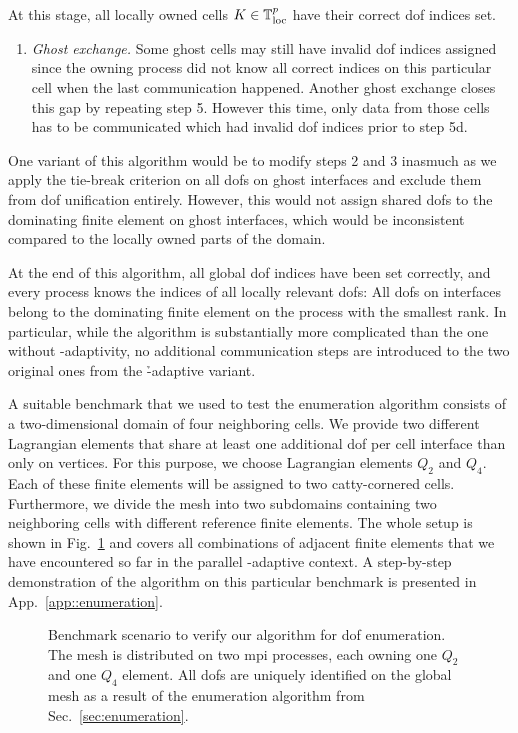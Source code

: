 At this stage, all locally owned cells $K \in \mathbb{T}^p_{\text{loc}}$ have their correct \gls{dof} indices set.
\begin{enumerate}[resume]
  \item \textit{Ghost exchange.}
  Some ghost cells may still have invalid \gls{dof} indices assigned since the owning process did not know all correct indices on this particular cell when the last communication happened. Another ghost exchange closes this gap by repeating step 5. However this time, only data from those cells has to be communicated which had invalid \gls{dof} indices prior to step 5d.
\end{enumerate}
One variant of this algorithm would be to modify steps 2 and 3 inasmuch as we apply the tie-break criterion on all \glspl{dof} on ghost interfaces and exclude them from \gls{dof} unification entirely. However, this would not assign shared \glspl{dof} to the dominating finite element on ghost interfaces, which would be inconsistent compared to the locally owned parts of the domain.

At the end of this algorithm, all global \gls{dof} indices have been set correctly, and every process knows the indices of all locally relevant \glspl{dof}: All \glspl{dof} on interfaces belong to the dominating finite element on the process with the smallest rank. In particular, while the algorithm is substantially more complicated than the one without \p-adaptivity, no additional communication steps are introduced to the two original ones from the \h-adaptive variant.

A suitable benchmark that we used to test the enumeration algorithm consists of a two-dimensional domain of four neighboring cells. We provide two different Lagrangian elements that share at least one additional \gls{dof} per cell interface than only on vertices. For this purpose, we choose Lagrangian elements $Q_2$ and $Q_4$. Each of these finite elements will be assigned to two catty-cornered cells. Furthermore, we divide the mesh into two subdomains containing two neighboring cells with different reference finite elements. The whole setup is shown in Fig.~\ref{fig:enumbenchmark} and covers all combinations of adjacent finite elements that we have encountered so far in the parallel \hp-adaptive context. A step-by-step demonstration of the algorithm on this particular benchmark is presented in App.~\ref{app::enumeration}.

\begin{figure}
\centering


\caption[Benchmark scenario for  enumeration.]{Benchmark scenario to verify our algorithm for \gls{dof} enumeration. The mesh is distributed on two \gls{mpi} processes, each owning one $Q_2$ and one $Q_4$ element. All \glspl{dof} are uniquely identified on the global mesh as a result of the enumeration algorithm from Sec.~\ref{sec:enumeration}.}
\label{fig:enumbenchmark}
\end{figure}


